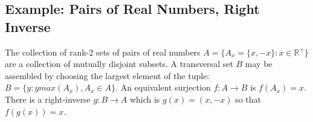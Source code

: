 \subsection{Example: Pairs of Real Numbers, Right Inverse}
The collection of rank-2 sets of pairs of real numbers $A= \{ A_x = \{x,-x\} : x\in \mathbb{R}^{+}\}$ are a collection of mutually disjoint subsets. A transversal set $B$ may be assembled by choosing the largest element of the tuple: $B = \{y : y max(A_x), A_x \in A \}$. An equivalent surjection $f:A\rightarrow B$ is $f(A_x) = x$. There is a right-inverse $g:B\rightarrow A$ which is $g(x) = (x,-x)$ so that $f(g(x)) = x$.







